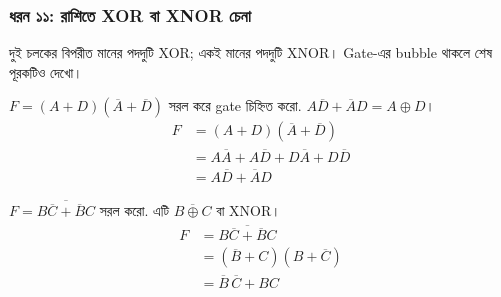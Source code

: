 \subsubsection*{ধরন ১১: রাশিতে XOR বা XNOR চেনা}
দুই চলকের বিপরীত মানের পদদুটি XOR; একই মানের পদদুটি XNOR। Gate-এর bubble থাকলে শেষ পূরকটিও দেখো।
\par\smallskip\noindent\begin{minipage}{\linewidth}
$F=(A+D)(\overline A+\overline D)$ সরল করে gate চিহ্নিত করো.
\chThreeAnswer $A\overline D+\overline AD=A\oplus D$।
\[\begin{aligned}F&=(A+D)(\overline A+\overline D)\\
&=A\overline A+A\overline D+D\overline A+D\overline D\\
&=A\overline D+\overline AD\end{aligned}\]

\end{minipage}\par\smallskip
\par\smallskip\noindent\begin{minipage}{\linewidth}
$F=\overline{B\overline C+\overline BC}$ সরল করো.
\chThreeAnswer এটি $\overline{B\oplus C}$ বা XNOR।
\[\begin{aligned}F&=\overline{B\overline C+\overline BC}\\
&=(\overline B+C)(B+\overline C)\\
&=\overline B\,\overline C+BC\end{aligned}\]

\end{minipage}\par\smallskip
{}
